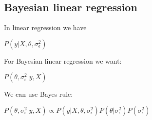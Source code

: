 
\subsection{Bayesian linear regression}

In linear regression we have

\(P(y|X, \theta, \sigma^2_\epsilon )\)

For Bayesian linear regression we want:

\(P(\theta, \sigma^2_\epsilon |y, X)\)

We can use Bayes rule:

\(P(\theta, \sigma^2_\epsilon |y, X)\propto P(y|X, \theta, \sigma^2_\epsilon )P(\theta |\sigma^2_\epsilon )P(\sigma^2_\epsilon )\)

